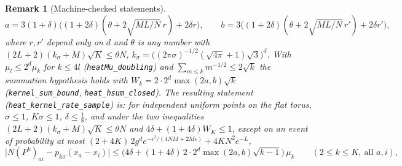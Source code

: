 \documentclass[11pt,a4paper]{article}
\theoremstyle{stmt}
\theoremstyle{defn}
\theoremstyle{rmk}
\newtheorem{remark}[theorem]{Remark}
\numberwithin{equation}{section}
\begin{document}
{\begin{remark}[Machine-checked statements]
\[
a=3(1+\delta)\big((1+2\delta)(\theta+2\sqrt{ML/N}\,r)+2\delta r\big),\qquad b=3\big((1+2\delta)(\theta+2\sqrt{ML/N}\,r')+2\delta r'\big),
\]
where $r,r'$ depend only on $d$ and $\theta$ is any number with $(2L+2)(k_\sigma+M)\sqrt K\le\theta N$, $k_\sigma=\big((2\pi\sigma)^{-1/2}(\sqrt{4\pi}+1)\sqrt3\big)^d$. With $\mu_l\le2^d\mu_k$ for $k\le4l$ (\texttt{heatMu\_doubling}) and $\sum_{m\le k}m^{-1/2}\le2\sqrt k$ the summation hypothesis holds with $W_k=2\cdot2^d\max(2a,b)\sqrt k$ (\texttt{kernel\_sum\_bound}, \texttt{heat\_hsum\_closed}). The resulting statement (\texttt{heat\_kernel\_rate\_sample}) is: for independent uniform points on the flat torus, $\sigma\le1$, $K\sigma\le1$, $\delta\le\frac18$, and under the two inequalities $(2L+2)(k_\sigma+M)\sqrt K\le\theta N$ and $4\delta+(1+4\delta)W_K\le1$, except on an event of probability at most $(2+4K)\,2g^de^{-\epsilon^2/(4NM+2M\epsilon)}+4KN^2e^{-L}$,
\[
\big|N(P^{k})_{ai}-p_{k\sigma}(x_a-x_i)\big|\le\big(4\delta+(1+4\delta)\,2\cdot2^d\max(2a,b)\sqrt{k-1}\big)\,\mu_k\qquad(2\le k\le K,\ \text{all }a,i),
\]

\end{remark}}
\end{document}
